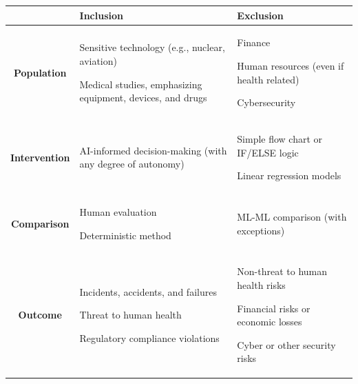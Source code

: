 \begin{tabularx}{\textwidth}{CXX}
\hline
\textbf{} & \centering \textbf{Inclusion} & \centering\arraybackslash \textbf{Exclusion} \\ \hline

\textbf{Population} & 
\begin{tablelist}
    \item Sensitive technology (e.g., nuclear, aviation)
    \item Medical studies, emphasizing equipment, devices, and drugs
    \item 
\end{tablelist} & 
\begin{tablelist}
    \item Finance
    \item Human resources (even if health related)
    \item Cybersecurity
\end{tablelist} \\ \hline

\textbf{Intervention} & 
\begin{tablelist}
    \item AI-informed decision-making (with any degree of autonomy)
    \item 
\end{tablelist} & 
\begin{tablelist}
    \item Simple flow chart or IF/ELSE logic
    \item Linear regression models
\end{tablelist} \\ \hline

\textbf{Comparison} & 
\begin{tablelist}
    \item Human evaluation
    \item Deterministic method
\end{tablelist} & 
\begin{tablelist}
    \item ML-ML comparison (with exceptions)
    \item 
\end{tablelist} \\ \hline

\textbf{Outcome} & 
\begin{tablelist}
    \item Incidents, accidents, and failures
    \item Threat to human health
    \item Regulatory compliance violations
\end{tablelist} & 
\begin{tablelist}
    \item Non-threat to human health risks
    \item Financial risks or economic losses
    \item Cyber or other security risks
    \item 
\end{tablelist} \\ \hline


\end{tabularx}
